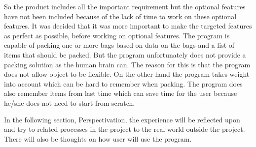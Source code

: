 So the product includes all the important requirement but the optional features have not been included because of the lack of time to work on these optional features. It was decided that it was more important to make the targeted features as perfect as possible, before working on optional features. The program is capable of packing one or more bags based on data on the bags and a list of items that should be packed. But the program unfortunately does not provide a packing solution as the human brain can. The reason for this is that the program does not allow object to be flexible. On the other hand the program takes weight into account which can be hard to remember when packing. The program does also remember items from last time which can save time for the user because he/she does not need to start from scratch.

In the following section, Perspectivation, the experience will be reflected upon and try to related processes in the project to the real world outside the project. There will also be thoughts on how user will use the program.